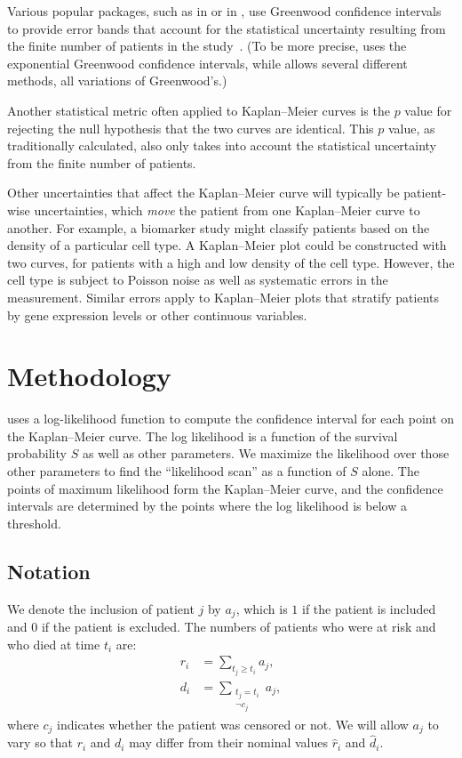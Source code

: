 \documentclass[article]{jss}
\newcommand{\KM}{Kaplan--Meier} %
\begin{document}
Various popular packages, such as  \citep{survival-package} in  \citep{R} or  \citep{lifelines} in , use Greenwood confidence intervals to provide error bands that account for the statistical uncertainty resulting from the finite number of patients in the study~\citep{GreenwoodNotes,Greenwood}. (To be more precise,  uses the exponential Greenwood confidence intervals, while  allows several different methods, all variations of Greenwood's.)

Another statistical metric often applied to \KM{} curves is the \(p\) value for rejecting the null hypothesis that the two curves are identical. This \(p\) value, as traditionally calculated, also only takes into account the statistical uncertainty from the finite number of patients.

Other uncertainties that affect the \KM{} curve will typically be patient-wise uncertainties, which \emph{move} the patient from one \KM{} curve to another. For example, a biomarker study might classify patients based on the density of a particular cell type. A \KM{} plot could be constructed with two curves, for patients with a high and low density of the cell type. However, the cell type is subject to Poisson noise as well as systematic errors in the measurement. Similar errors apply to \KM{} plots that stratify patients by gene expression levels or other continuous variables.

\section{Methodology}\label{sec:methodology}

 uses a log-likelihood function to compute the confidence interval for each point on the \KM{} curve. The log likelihood is a function of the survival probability \(S\) as well as other parameters. We maximize the likelihood over those other parameters to find the ``likelihood scan'' as a function of \(S\) alone. The points of maximum likelihood form the \KM{} curve, and the confidence intervals are determined by the points where the log likelihood is below a threshold.

\subsection{Notation}\label{sec:notation}

We denote the inclusion of patient \(j\) by \(a_j\), which is \(1\) if the patient is included and \(0\) if the patient is excluded. The numbers of patients who were at risk and who died at time \(t_i\) are:
\begin{align}
r_i &= \sum_{t_j \geq t_i} a_j, \\
d_i &= \sum_{\substack{t_j = t_i \\ \neg c_j}} a_j,
\end{align}
where \(c_j\) indicates whether the patient was censored or not. We will allow \(a_j\) to vary so that \(r_i\) and \(d_i\) may differ from their nominal values \(\hat{r}_i\) and \(\hat{d}_i\).
\end{document}
